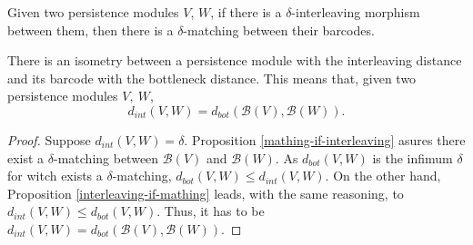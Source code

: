 \begin{proposition}\label{mathing-if-interleaving}
    Given two persistence modules $ V $, $ W $, if there is a $\delta$-interleaving morphism between them, then there is a $ \delta$-matching between their barcodes.
\end{proposition}

\begin{theorem}[Stability]
    There is an isometry between a persistence module with the interleaving distance and its barcode with the bottleneck distance. This means that, given two persistence modules $ V, \ W $, 
    $$ 
        d_{int} (V, W) = d_{bot} (\mathcal B(V), \mathcal B(W)).
    $$
\end{theorem}
\begin{proof}
    Suppose $ d_{int}(V, W) = \delta $. Proposition \ref{mathing-if-interleaving} asures there exist a $\delta$-matching between $ \mathcal B(V) $ and $ \mathcal B (W) $. As $ d_{bot}(V, W) $ is the infimum $\delta$ for witch exists a $\delta$-matching, $ d_{bot}(V, W) \leq d_{int}(V, W)$. On the other hand, Proposition \ref{interleaving-if-mathing} leads, with the same reasoning, to $ d_{int}(V, W) \leq d_{bot}(V, W)$. Thus, it has to be $ d_{int} (V, W) = d_{bot} (\mathcal B(V), \mathcal B(W)) $.
\end{proof}

